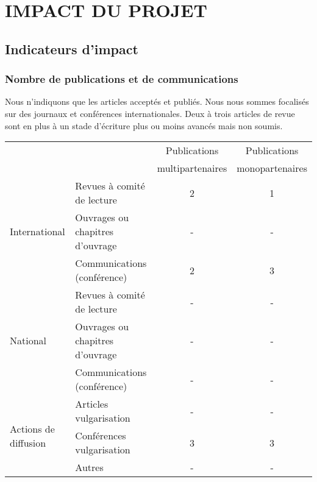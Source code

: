 \section{IMPACT DU PROJET}
\label{sec:impact}

\subsection{Indicateurs d’impact}
\subsubsection*{Nombre de publications et de communications}
Nous n'indiquons que les articles acceptés et publiés. Nous nous sommes focalisés sur des journaux et conférences internationales. Deux à trois articles de revue sont en plus à un stade d'écriture plus ou moins avancés mais non soumis.

\begin{table}[htbp]
\small
    \centering
    \begin{tabular}{|p{3.25cm}|p{3.25cm}|c|c|}
    \hline
&  & Publications & Publications\\
 & &multipartenaires & monopartenaires \\
\hline

\multirow{3}{*}{International}&Revues à comité de lecture& 2&1\\\cline{2-4}
&Ouvrages ou chapitres d’ouvrage& -&-\\\cline{2-4}
&Communications (conférence)&2&3\\\hline
\multirow{3}{*}{National}&Revues à comité de lecture&-&-\\\cline{2-4}
&Ouvrages ou chapitres d’ouvrage&-&-\\\cline{2-4}
&Communications (conférence)&-&-\\\hline
\multirow{3}{*}{Actions de diffusion}&Articles vulgarisation&-&-\\\cline{2-4}
&Conférences vulgarisation&3&3\\\cline{2-4}
&Autres&-&-\\
\hline
    \end{tabular}
    \label{tab:publis}
\end{table}


